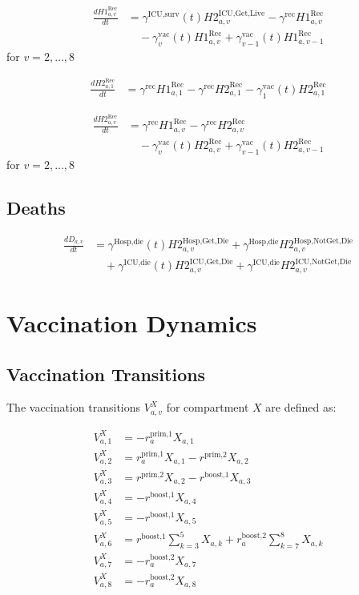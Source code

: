 \documentclass[12pt]{article}
\begin{document}
\begin{align*}
\frac{dH1^{\text{Rec}}_{a,v}}{dt} &= \gamma^{\text{ICU,surv}}(t) H2^{\text{ICU,Get,Live}}_{a,v} - \gamma^{\text{rec}} H1^{\text{Rec}}_{a,v} \\
&\quad - \gamma^{\text{vac}}_v(t) H1^{\text{Rec}}_{a,v} + \gamma^{\text{vac}}_{v-1}(t) H1^{\text{Rec}}_{a,v-1}
\end{align*}
for $v = 2, \ldots, 8$

\begin{align*}
\frac{dH2^{\text{Rec}}_{a,1}}{dt} &= \gamma^{\text{rec}} H1^{\text{Rec}}_{a,1} - \gamma^{\text{rec}} H2^{\text{Rec}}_{a,1} - \gamma^{\text{vac}}_1(t) H2^{\text{Rec}}_{a,1}
\end{align*}

\begin{align*}
\frac{dH2^{\text{Rec}}_{a,v}}{dt} &= \gamma^{\text{rec}} H1^{\text{Rec}}_{a,v} - \gamma^{\text{rec}} H2^{\text{Rec}}_{a,v} \\
&\quad - \gamma^{\text{vac}}_v(t) H2^{\text{Rec}}_{a,v} + \gamma^{\text{vac}}_{v-1}(t) H2^{\text{Rec}}_{a,v-1}
\end{align*}
for $v = 2, \ldots, 8$

\subsection{Deaths}

\begin{align*}
\frac{dD_{a,v}}{dt} &= \gamma^{\text{Hosp,die}}(t) H2^{\text{Hosp,Get,Die}}_{a,v} + \gamma^{\text{Hosp,die}} H2^{\text{Hosp,NotGet,Die}}_{a,v} \\
&\quad + \gamma^{\text{ICU,die}}(t) H2^{\text{ICU,Get,Die}}_{a,v} + \gamma^{\text{ICU,die}} H2^{\text{ICU,NotGet,Die}}_{a,v}
\end{align*}

\section{Vaccination Dynamics}

\subsection{Vaccination Transitions}

The vaccination transitions $V^X_{a,v}$ for compartment $X$ are defined as:

\begin{align*}
V^X_{a,1} &= -r^{\text{prim,1}}_a X_{a,1} \\
V^X_{a,2} &= r^{\text{prim,1}}_a X_{a,1} - r^{\text{prim,2}} X_{a,2} \\
V^X_{a,3} &= r^{\text{prim,2}} X_{a,2} - r^{\text{boost,1}} X_{a,3} \\
V^X_{a,4} &= -r^{\text{boost,1}} X_{a,4} \\
V^X_{a,5} &= -r^{\text{boost,1}} X_{a,5} \\
V^X_{a,6} &= r^{\text{boost,1}} \sum_{k=3}^5 X_{a,k} + r^{\text{boost,2}}_a \sum_{k=7}^8 X_{a,k} \\
V^X_{a,7} &= -r^{\text{boost,2}}_a X_{a,7} \\
V^X_{a,8} &= -r^{\text{boost,2}}_a X_{a,8}
\end{align*}
\end{document}
